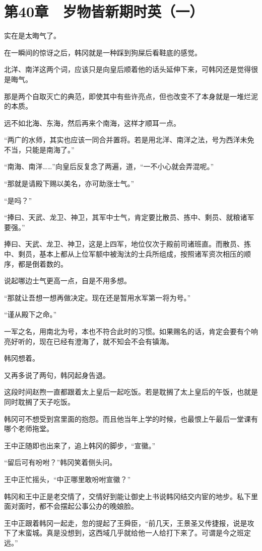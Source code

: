 \section{第40章　岁物皆新期时英（一）}

实在是太晦气了。

在一瞬间的惊讶之后，韩冈就是一种踩到狗屎后看鞋底的感觉。

北洋、南洋这两个词，应该只是向皇后顺着他的话头延伸下来，可韩冈还是觉得很是晦气。

那是两个自取灭亡的典范，即使其中有些许亮点，但也改变不了本身就是一堆烂泥的本质。

远不如北海、东海，然后再来个南海，这样才顺耳一点。

“两广的水师，其实也应该一同合并置将。若是用北洋、南洋之法，号为西洋未免不当，只能是南海了。”

“南海、南洋……”向皇后反复念了两遍，道，“一不小心就会弄混呢。”

“那就是请殿下赐以美名，亦可助涨士气。”

“是吗？”

“捧曰、天武、龙卫、神卫，其军中士气，肯定要比散员、拣中、剩员、就粮诸军要强。”

捧曰、天武、龙卫、神卫，这是上四军，地位仅次于殿前司诸班直。而散员、拣中、剩员，基本上都从上位军额中被淘汰的士兵所组成，按照诸军资次相压的顺序，都是倒着数的。

说起哪边士气更高一点，自是不用多想。

“那就让吾想一想再做决定。现在还是暂用水军第一将为号。”

“谨从殿下之命。”

一军之名，用南北为号，本也不符合此时的习惯。如果赐名的话，肯定会要有个响亮好听的，现在已经有澄海了，就不知会不会有镇海。

韩冈想着。

又再多说了两句，韩冈起身告退。

这段时间赵煦一直都跟着太上皇后一起吃饭。若是耽搁了太上皇后的午饭，也就是同时耽搁了天子吃饭。

韩冈可不想受到宫里面的抱怨。而且他当年上学的时候，也最恨上午最后一堂课有哪个老师拖堂。

王中正随即也出来了，追上韩冈的脚步，“宣徽。”

“留后可有吩咐？”韩冈笑着侧头问。

王中正忙摇头，“中正哪里敢吩咐宣徽？”

韩冈和王中正是老交情了，交情好到能让御史上书说韩冈结交内宦的地步。私下里面对面时，都不会摆起公事公办的晚娘脸。

王中正跟着韩冈一起走，忽的提起了王舜臣，“前几天，王景圣又传捷报，说是攻下了末蛮城。真是没想到，这西域几乎就给他一人给打下来了。可谓是今之班定远。”

